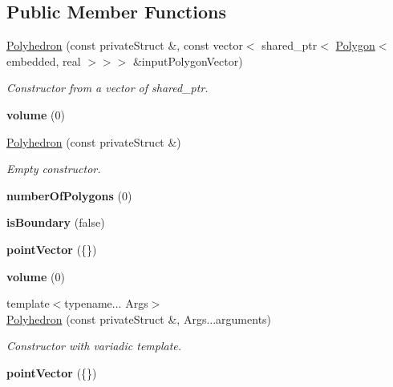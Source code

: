 \subsection*{\-Public \-Member \-Functions}
\begin{DoxyCompactItemize}
\item 
\hyperlink{class_polyhedron_ae7091aa1c81e60e701528ed4803f9d20}{\-Polyhedron} (const private\-Struct \&, const vector$<$ shared\-\_\-ptr$<$ \hyperlink{class_polygon}{\-Polygon}$<$ embedded, real $>$$>$$>$ \&input\-Polygon\-Vector)
\begin{DoxyCompactList}\small\item\em \-Constructor from a vector of shared\-\_\-ptr. \end{DoxyCompactList}\item 
\hypertarget{class_polyhedron_adaff1d63d7ed627999302120b6c98914}{{\bfseries volume} (0)}\label{class_polyhedron_adaff1d63d7ed627999302120b6c98914}

\item 
\hyperlink{class_polyhedron_a43f9a7fdfcf838c4aa07d95bb3717b51}{\-Polyhedron} (const private\-Struct \&)
\begin{DoxyCompactList}\small\item\em \-Empty constructor. \end{DoxyCompactList}\item 
\hypertarget{class_polyhedron_a0313d03022d9517453e3c74370e16154}{{\bfseries number\-Of\-Polygons} (0)}\label{class_polyhedron_a0313d03022d9517453e3c74370e16154}

\item 
\hypertarget{class_polyhedron_a03522cce68b4d9cd30eee4c43dfc2f72}{{\bfseries is\-Boundary} (false)}\label{class_polyhedron_a03522cce68b4d9cd30eee4c43dfc2f72}

\item 
\hypertarget{class_polyhedron_ae911984d4632328d2639e46162cae26e}{{\bfseries point\-Vector} (\{\})}\label{class_polyhedron_ae911984d4632328d2639e46162cae26e}

\item 
\hypertarget{class_polyhedron_adaff1d63d7ed627999302120b6c98914}{{\bfseries volume} (0)}\label{class_polyhedron_adaff1d63d7ed627999302120b6c98914}

\item 
{\footnotesize template$<$typename... \-Args$>$ }\\\hyperlink{class_polyhedron_a31d0c019cb8aeb7c74d58aa39f91e2f6}{\-Polyhedron} (const private\-Struct \&, \-Args...\-arguments)
\begin{DoxyCompactList}\small\item\em \-Constructor with variadic template. \end{DoxyCompactList}\item 
\hypertarget{class_polyhedron_ae911984d4632328d2639e46162cae26e}{{\bfseries point\-Vector} (\{\})}\label{class_polyhedron_ae911984d4632328d2639e46162cae26e}


\end{DoxyCompactItemize}
